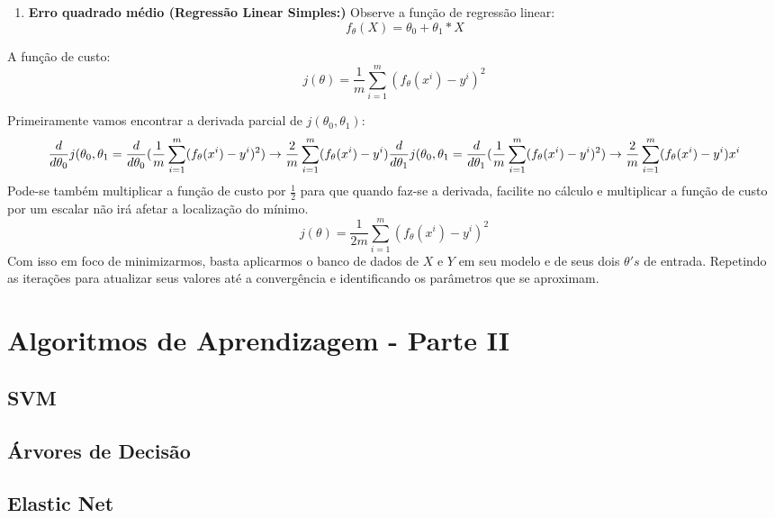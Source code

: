 \documentclass[
]{book}
\providecommand{\tightlist}{%
  \setlength{\itemsep}{0pt}\setlength{\parskip}{0pt}}
\begin{document}
\begin{enumerate}
\def\labelenumi{\arabic{enumi}.}
\setcounter{enumi}{2}
\tightlist
\item
  \textbf{Erro quadrado médio (Regressão Linear Simples:)} Observe a função de regressão linear:
  \[f_\theta(X)=\theta_0+\theta_1*X\]
\end{enumerate}

A função de custo:
\[j(\theta)=\frac{1}{m}\displaystyle \sum^m_{i=1}(f_\theta(x^i)-y^i)^2\]

Primeiramente vamos encontrar a derivada parcial de \(j(\theta_0,\theta_1)\):
\[\frac{d}{d\theta_0}j(\theta_0,\theta_1=\frac{d}{d\theta_0}(\frac{1}{m}\displaystyle \sum^m_{i=1}(f_{\theta}(x^i)-y^i)^2) \rightarrow \frac{2}{m}\displaystyle \sum^m_{i=1}(f_\theta(x^i)-y^i) \\
\frac{d}{d\theta_1}j(\theta_0,\theta_1=\frac{d}{d\theta_1}(\frac{1}{m}\displaystyle \sum^m_{i=1}(f_{\theta}(x^i)-y^i)^2) \rightarrow \frac{2}{m}\displaystyle \sum^m_{i=1}(f_\theta(x^i)-y^i)x^i\]
Pode-se também multiplicar a função de custo por \(\frac{1}{2}\) para que quando faz-se a derivada, facilite no cálculo e multiplicar a função de custo por um escalar não irá afetar a localização do mínimo.
\[j(\theta)=\frac{1}{2m}\displaystyle \sum^m_{i=1}(f_\theta(x^i)-y^i)^2\]
Com isso em foco de minimizarmos, basta aplicarmos o banco de dados de \(X\) e \(Y\) em seu modelo e de seus dois \(\theta's\) de entrada. Repetindo as iterações para atualizar seus valores até a convergência e identificando os parâmetros que se aproximam.

\hypertarget{ptII}{%
\chapter{Algoritmos de Aprendizagem - Parte II}\label{ptII}}

\hypertarget{svm}{%
\section{SVM}\label{svm}}

\hypertarget{uxe1rvores-de-decisuxe3o}{%
\section{Árvores de Decisão}\label{uxe1rvores-de-decisuxe3o}}

\hypertarget{elastic-net}{%
\section{Elastic Net}\label{elastic-net}}
\end{document}
